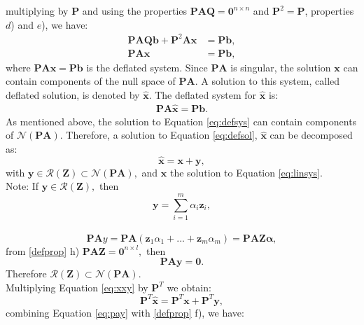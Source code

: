 \documentclass[12pt]{article}
\begin{document}
multiplying by $\mathbf{P}$ and using the properties $\mathbf{P}\mathbf{A}\mathbf{Q}=
\mathbf{0}^{n\times n}$ and $\mathbf{P}^2=\mathbf{P}$, properties $d$) and $e$), we have:
\begin{align}\label{eq:defsys}
\mathbf{P}\mathbf{A}\mathbf{Q}\mathbf{b}+\mathbf{P}^2\mathbf{A}\mathbf{x}&=\mathbf{P}\mathbf{b},\nonumber \\
\mathbf{P}\mathbf{A}\mathbf{x}&=\mathbf{P}\mathbf{b},
\end{align}
where $\mathbf{P}\mathbf{A}\mathbf{x}=\mathbf{P}\mathbf{b}$ is the deflated system. Since 
$\mathbf{P}\mathbf{A}$ is singular, the solution $\mathbf{x}$ can contain
components of the null space of $\mathbf{P}\mathbf{A}$. A solution to this system, called deflated
solution, is denoted by $\mathbf{\hat{x}}$.
The deflated system for $\mathbf{\hat{x}}$ is:
\begin{align}\label{eq:defsol}
\mathbf{P}\mathbf{A} \hat{\mathbf{x}}=\mathbf{P}\mathbf{b}.
\end{align}
As mentioned above, the solution to Equation \eqref{eq:defsys} can contain components of 
$\mathcal{N}(\mathbf{P}\mathbf{A})$. Therefore, a solution to Equation \eqref{eq:defsol},
$\mathbf{\hat{x}}$ can be decomposed as:
\begin{equation}\label{eq:xxy}
\mathbf{\hat{x}}=\mathbf{x}+ \mathbf{y},
\end{equation}
with $\mathbf{y} \in \mathcal{R}(\mathbf{Z})\subset \mathcal{N}(\mathbf{P}\mathbf{A}),$ 
and $\mathbf{x}$ the solution to Equation \eqref{eq:linsys}.\\
Note: If $\mathbf{y} \in \mathcal{R}(\mathbf{Z}),$ then $$\mathbf{y}=\sum^{m}_{i=1}\alpha_i \mathbf{z}_i,$$\\
 \begin{equation}\label{eq:paz}
 \mathbf{P}\mathbf{A}y=\mathbf{P}\mathbf{A}(\mathbf{z}_1\alpha_1 +...+ \mathbf{z}_m\alpha_m)=\mathbf{P}\mathbf{A}\mathbf{Z}\mathbf{\alpha},\end{equation}
 from \ref{defprop} h) $\mathbf{P}\mathbf{A}\mathbf{Z}=\mathbf{0}^{n\times l},$ then 
 \begin{equation}\label{eq:pay}
 \mathbf{P}\mathbf{A}\mathbf{y}=\mathbf{0}.
 \end{equation}
Therefore $\mathcal{R}(\mathbf{Z})\subset \mathcal{N}(\mathbf{P}\mathbf{A}).$ \\
Multiplying Equation \eqref{eq:xxy} by $\mathbf{P}^T$ we obtain:
$$\mathbf{P}^T\mathbf{\hat{x}}=\mathbf{P}^T\mathbf{x}+\mathbf{P}^T\mathbf{y},$$
combining Equation \eqref{eq:pay} with \ref{defprop} f), we have:
\end{document}

